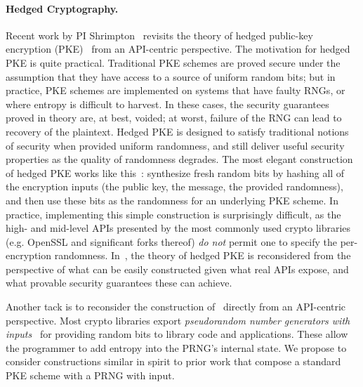 \begin{task}
\end{task}
%

\paragraph{Hedged Cryptography. }
Recent work by PI Shrimpton~\cite{BPS} revisits the theory of
hedged public-key encryption (PKE)~\cite{BBN+} from an API-centric perspective.
%
The motivation for hedged PKE is quite practical. Traditional
PKE schemes are proved secure under the assumption that they have access to a
source of uniform random bits; but in practice, PKE schemes are implemented on
systems that have faulty RNGs, or where entropy is difficult to harvest.  In
these cases, the security guarantees proved in theory are, at best, voided; at
worst, failure of the RNG can lead to recovery of the plaintext.
%
Hedged PKE is designed to satisfy traditional notions of security when provided
uniform randomness, and still deliver useful security properties as the quality
of randomness degrades.  The most elegant construction of hedged PKE works like
this~\cite{BBN+,BH15}: synthesize fresh random bits by hashing all of the
encryption inputs (the public key, the message, the provided randomness), and
then use these bits as the randomness for an underlying PKE scheme.  In
practice, implementing this simple construction is surprisingly difficult, as
the high- and mid-level APIs presented by the most commonly used crypto
libraries (e.g. OpenSSL and significant forks thereof) \emph{do not} permit one
to specify the per-encryption randomness. In~\cite{BPS}, the theory of hedged
PKE is reconsidered from the perspective of what can be easily constructed given
what real APIs expose, and what provable security guarantees these can achieve.

\begin{task}
  Another tack is to reconsider the construction of~\cite{BBN+,BH15} directly
  from an API-centric perspective.
  Most crypto libraries export \emph{pseudorandom number generators with
  inputs}~\cite{BH05,ST15} for providing random bits to library code and
  applications. These allow the programmer to add entropy into the PRNG's
  internal state.
  We propose to consider constructions similar in spirit to prior work
  that compose a standard PKE scheme with a PRNG with input.
\end{task}

